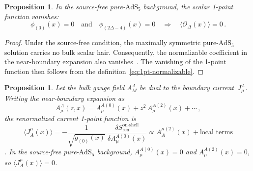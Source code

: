\documentclass[
  aps,
  prd,
  preprint,
  groupedaddress,
  nofootinbib,
  longbibliography
]{revtex4-2}
\newtheorem{proposition}[definition]{Proposition}
\theoremstyle{remark}
\newcommand{\AdS}{\mathrm{AdS}}
\begin{document}
\begin{proposition}\label{prop:bulk-scalar-vanish}
In the source-free pure-$\AdS_5$ background, the scalar 1-point
function vanishes:
\begin{equation}\label{eq:bulk-scalar-vanish}
  \phi_{(0)}(x)=0
  \quad\text{and}\quad
  \phi_{(2\Delta-4)}(x)=0
  \quad\Longrightarrow\quad
  \langle\mathcal{O}_\Delta(x)\rangle = 0\,.
\end{equation}
\end{proposition}

\begin{proof}
Under the source-free condition, the maximally symmetric
pure-$\AdS_5$ solution carries no bulk scalar hair.
Consequently, the normalizable coefficient in the near-boundary
expansion also vanishes~\cite{ref9,ref10,ref11}.
The vanishing of the 1-point function then follows from the
definition~\eqref{eq:1pt-normalizable}.
\end{proof}

\begin{proposition}\label{prop:bulk-current}
Let the bulk gauge field $A_M^A$ be dual to the boundary
current~$J_\mu^A$.
Writing the near-boundary expansion as
\begin{equation}\label{eq:A-expansion}
  A_\mu^A(z,x)
  = A_\mu^{A(0)}(x) + z^2\,A_\mu^{A(2)}(x) + \cdots\,,
\end{equation}
the renormalized current 1-point function is
\begin{equation}\label{eq:1pt-bulk-current}
  \langle J_A^\mu(x)\rangle
  = -\frac{1}{\sqrt{g_{(0)}(x)}}\,
    \frac{\delta S_{\mathrm{ren}}^{\mathrm{on\text{-}shell}}}
         {\delta A_\mu^{A(0)}(x)}
  \propto A_A^{\mu(2)}(x)
    + \text{local terms}
\end{equation}
\cite{ref9,ref10,ref11}.
In the source-free pure-$\AdS_5$ background,
$A_\mu^{A(0)}(x)=0$ and $A_\mu^{A(2)}(x)=0$, so
$\langle J_A^\mu(x)\rangle = 0$.
\end{proposition}
\end{document}
